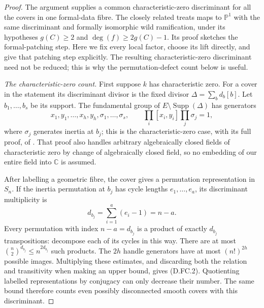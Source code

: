\begin{proof}
The argument supplies a common characteristic-zero discriminant for
all the covers in one formal-data fibre. The closely related
\citet[Proposition 4.2, pp.\ 4--6]{DeJongKatzCurvesB} treats maps to
$\mathbb P^1$ with the same discriminant and formally isomorphic wild
ramification, under its hypotheses $g(C)\ge2$ and
$\deg(f)\ge2g(C)-1$. Its proof sketches the formal-patching step.
Here we fix every local factor, choose its lift directly, and give
that patching step explicitly. The resulting characteristic-zero
discriminant need not be reduced; this is why the permutation-defect
count below is useful.

\emph{The characteristic-zero count.}
First suppose $k$ has characteristic zero. For a cover in the
statement its discriminant divisor is the fixed divisor
$\Delta=\sum_b d_b[b]$. Let $b_1,\ldots,b_s$ be its support.
The fundamental group of $E\setminus\operatorname{Supp}(\Delta)$
has generators
\[
 x_1,y_1,\ldots,x_h,y_h,\sigma_1,\ldots,\sigma_s,
 \qquad \prod_i[x_i,y_i]\prod_j\sigma_j=1,             \tag{D.FC.3}
\]
where $\sigma_j$ generates inertia at $b_j$; this is the
characteristic-zero case, with its full proof, of
\citet[Expos\'e XIII, Corollary 2.12, pp.\ 392--394]{SGA1}.
That proof also handles arbitrary algebraically closed fields of
characteristic zero by change of algebraically closed field, so no
embedding of our entire field into $\mathbb C$ is assumed.

After labelling a geometric fibre, the cover gives a permutation
representation in $S_n$. If the inertia permutation at $b_j$ has
cycle lengths $e_1,\ldots,e_a$, its discriminant multiplicity is
\[
                    d_{b_j}=\sum_{i=1}^a(e_i-1)=n-a.   \tag{D.FC.4}
\]
Every permutation with index $n-a=d_{b_j}$ is a product of exactly
$d_{b_j}$ transpositions: decompose each of its cycles in this way.
There are at most $\binom n2^{d_{b_j}}\le n^{2d_{b_j}}$
such products. The $2h$ handle generators have at most $(n!)^{2h}$
possible images. Multiplying these estimates, and discarding both
the relation and transitivity when making an upper bound, gives
(D.FC.2). Quotienting labelled representations by conjugacy can
only decrease their number. The same bound therefore counts even
possibly disconnected smooth covers with this discriminant.


\end{proof}
